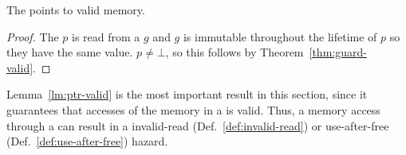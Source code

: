 \begin{lemma}\label{lm:ptr-valid}
  The  points to valid memory.
\end{lemma}
\begin{proof}
  The   $p$ is read from a  $g$ and $g$ is immutable throughout the lifetime of
  $p$ so they have the same value. $p \neq \bot$, so this follows by Theorem~\ref{thm:guard-valid}.
\end{proof}

Lemma~\ref{lm:ptr-valid} is the most important result in this section, since it guarantees that
accesses of the memory in a  is valid. Thus, a memory access through a  can result
in a invalid-read (Def.~\ref{def:invalid-read}) or use-after-free (Def.~\ref{def:use-after-free})
hazard.
